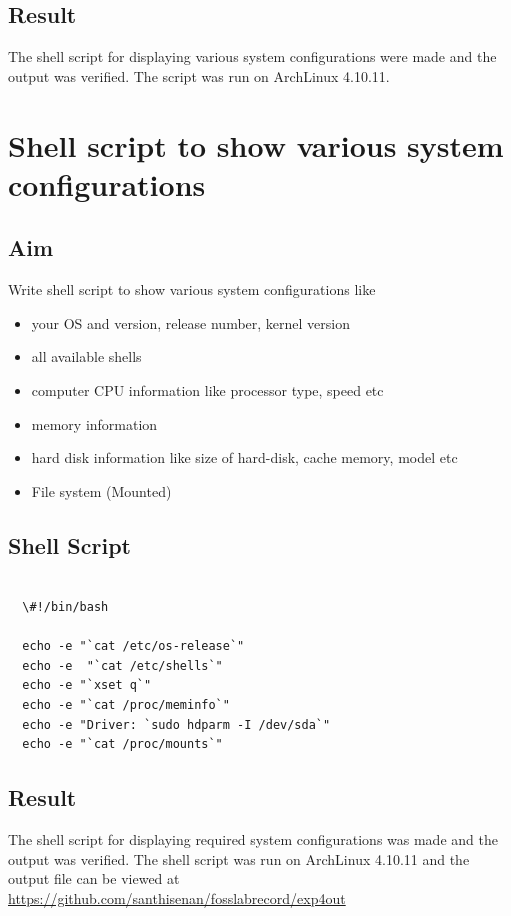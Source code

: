 \documentclass{article}
\begin{document}
\subsection{Result}
The shell script for displaying various system configurations were made and the output was verified. The script was run on ArchLinux 4.10.11.
\begin{refsection}
\cite{shellbible}
\cite{shellbook}
\printbibliography
\end{refsection}

\newpage

\newpage

\section{Shell script to show various system configurations}

\subsection {Aim}

Write shell script to show various system configurations like
\begin{itemize}
\item your OS and version, release number, kernel version
\item all available shells
\item computer CPU information like processor type, speed etc
\item memory information
\item hard disk information like size of hard-disk, cache memory, model etc
\item File system (Mounted)
\end{itemize}

\subsection{Shell Script}

\begin{verbatim}

  \#!/bin/bash
   
  echo -e "`cat /etc/os-release`"
  echo -e  "`cat /etc/shells`"
  echo -e "`xset q`"
  echo -e "`cat /proc/meminfo`"
  echo -e "Driver: `sudo hdparm -I /dev/sda`"
  echo -e "`cat /proc/mounts`"

\end{verbatim}

\subsection{Result}
The shell script for displaying required system configurations was made and the output was verified. The shell script was run on ArchLinux 4.10.11 and the output file can be viewed at \url{https://github.com/santhisenan/fosslabrecord/exp4out}
\end{document}
